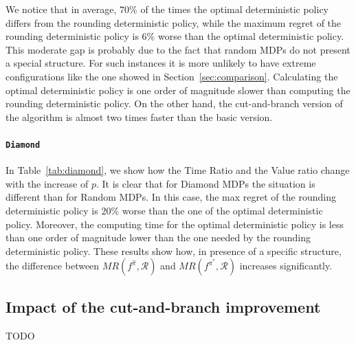 We notice that in average, $70\%$ of the times the optimal deterministic policy differs from the rounding deterministic policy, while the maximum regret of the rounding deterministic policy is $6\%$ worse than the optimal deterministic policy. This moderate gap is probably due to the fact that random MDPs do not present a special structure. For such instances it is more unlikely to have extreme configurations like the one showed in Section~\ref{sec:comparison}.
Calculating the optimal deterministic policy is one order of magnitude slower than computing the rounding deterministic policy. On the other hand, the cut-and-branch version of the algorithm is almost two times faster than the basic version.  
 
\paragraph{\texttt{Diamond}}
In Table~\ref{tab:diamond}, we show how the Time Ratio and the Value ratio change with the increase of $p$.
It is clear that for Diamond MDPs the situation is different than for Random MDPs. In this case, the max regret of the rounding deterministic policy is $20\%$ worse than the one of the optimal deterministic policy. Moreover, the computing time for the optimal deterministic policy is less than one order of magnitude lower than the one needed by the rounding deterministic policy. These results show how, in presence of a specific structure, the difference between $MR(f^{\hat{\pi}}, \mathcal{R})$ and $MR(f^{\pi^*}, \mathcal{R})$ increases significantly.






\subsection{Impact of the cut-and-branch improvement}
TODO
